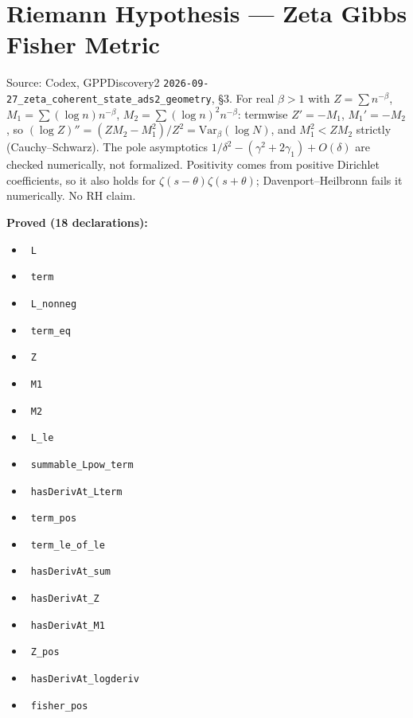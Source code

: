\documentclass{report}
\theoremstyle{definition}
\begin{document}
\section{Riemann Hypothesis --- Zeta Gibbs Fisher Metric}
Source: Codex, GPPDiscovery2 \texttt{2026-09-27\_zeta\_coherent\_state\_ads2\_geometry}, \S3. For real $\beta>1$ with $Z=\sum n^{-\beta}$, $M_1=\sum(\log n)n^{-\beta}$, $M_2=\sum(\log n)^2n^{-\beta}$: termwise $Z'=-M_1$, $M_1'=-M_2$, so $(\log Z)''=(ZM_2-M_1^2)/Z^2=\mathrm{Var}_\beta(\log N)$, and $M_1^2<ZM_2$ strictly (Cauchy--Schwarz). The pole asymptotics $1/\delta^2-(\gamma^2+2\gamma_1)+O(\delta)$ are checked numerically, not formalized. Positivity comes from positive Dirichlet coefficients, so it also holds for $\zeta(s-\theta)\zeta(s+\theta)$; Davenport--Heilbronn fails it numerically. No RH claim.

\noindent\textbf{Proved (18 declarations):}
\begin{itemize}
  \item {}\leanok\ \texttt{L}
  \item {}\leanok\ \texttt{term}
  \item {}\leanok\ \texttt{L\_nonneg}
  \item {}\leanok\ \texttt{term\_eq}
  \item {}\leanok\ \texttt{Z}
  \item {}\leanok\ \texttt{M1}
  \item {}\leanok\ \texttt{M2}
  \item {}\leanok\ \texttt{L\_le}
  \item {}\leanok\ \texttt{summable\_Lpow\_term}
  \item {}\leanok\ \texttt{hasDerivAt\_Lterm}
  \item {}\leanok\ \texttt{term\_pos}
  \item {}\leanok\ \texttt{term\_le\_of\_le}
  \item {}\leanok\ \texttt{hasDerivAt\_sum}
  \item {}\leanok\ \texttt{hasDerivAt\_Z}
  \item {}\leanok\ \texttt{hasDerivAt\_M1}
  \item {}\leanok\ \texttt{Z\_pos}
  \item {}\leanok\ \texttt{hasDerivAt\_logderiv}
  \item {}\leanok\ \texttt{fisher\_pos}
\end{itemize}
\end{document}
